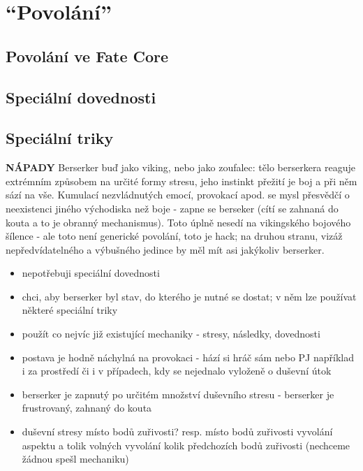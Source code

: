 
\chapter{``Povolání''}
\label{chap:speciality}

\section{Povolání ve Fate Core}
\label{sec:povolani-fate-core}

\section{Speciální dovednosti}
\label{sec:specialni-dovednosti}

\section{Speciální triky}
\label{sec:specialni-triky}


\textbf{NÁPADY}
Berserker buď jako viking, nebo jako zoufalec: tělo berserkera reaguje extrémním způsobem na určité formy stresu, jeho instinkt přežití je boj a při něm sází na vše. Kumulací nezvládnutých emocí, provokací apod. se mysl přesvědčí o neexistenci jiného východiska než boje - zapne se berseker (cítí se zahnaná do kouta a to je obranný mechanismus).
Toto úplně nesedí na vikingského bojového šílence - ale toto není generické povolání, toto je hack; na druhou stranu, vizáž nepředvídatelného a výbušného jedince by měl mít asi jakýkoliv berserker.

\begin{itemize}
\item  nepotřebuji speciální dovednosti
\item  chci, aby berserker byl stav, do kterého je nutné se dostat; v něm lze používat některé speciální triky
\item  použít co nejvíc již existující mechaniky - stresy, následky, dovednosti
\item  postava je hodně náchylná na provokaci - hází si hráč sám nebo PJ například i za prostředí či i v případech, kdy se nejednalo vyloženě o duševní útok
\item  berserker je zapnutý po určitém množství duševního stresu - berserker je frustrovaný, zahnaný do kouta
\item  duševní stresy místo bodů zuřivosti? resp. místo bodů zuřivosti vyvolání aspektu a tolik volných vyvolání kolik předchozích bodů zuřivosti (nechceme žádnou spešl mechaniku)
\end{itemize}

